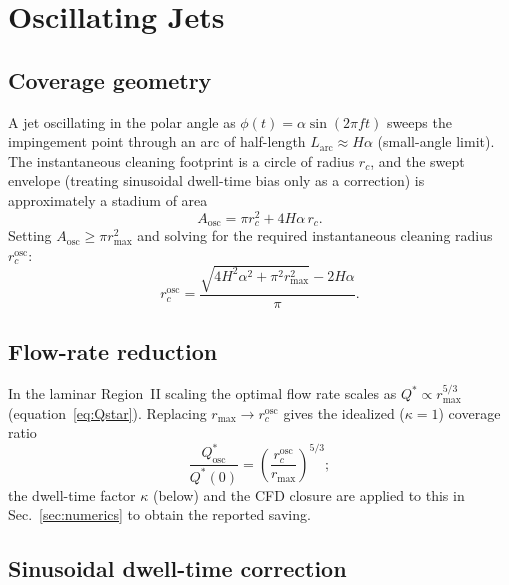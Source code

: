 \documentclass[aps,prfluids,reprint,amsmath,amssymb,floatfix]{revtex4-2}
\begin{document}
\section{Oscillating Jets}
\label{sec:oscillating}

\subsection{Coverage geometry}

A jet oscillating in the polar angle as $\phi(t) = \alpha\sin(2\pi f t)$
sweeps the impingement point through an arc of half-length $L_\mathrm{arc}
\approx H\alpha$ (small-angle limit). The instantaneous cleaning footprint
is a circle of radius $r_c$, and the swept envelope (treating sinusoidal
dwell-time bias only as a correction) is approximately a stadium of area
\begin{equation}
  A_\mathrm{osc} = \pi r_c^2 + 4 H \alpha\,r_c.
  \label{eq:Aosc}
\end{equation}
Setting $A_\mathrm{osc} \geq \pi r_\mathrm{max}^2$ and solving for the
required instantaneous cleaning radius $r_c^\mathrm{osc}$:
\begin{equation}
  r_c^\mathrm{osc} =
  \frac{\sqrt{4 H^2 \alpha^2 + \pi^2 r_\mathrm{max}^2} - 2 H\alpha}{\pi}.
  \label{eq:rcosc}
\end{equation}

\subsection{Flow-rate reduction}

In the laminar Region~II scaling the optimal flow rate scales as
$Q^* \propto r_\mathrm{max}^{5/3}$ (equation~\eqref{eq:Qstar}). Replacing
$r_\mathrm{max} \to r_c^\mathrm{osc}$ gives the idealized ($\kappa = 1$)
coverage ratio
\begin{equation}
  \frac{Q^*_\mathrm{osc}}{Q^*(0)} = \left(\frac{r_c^\mathrm{osc}}{r_\mathrm{max}}\right)^{5/3};
  \label{eq:Qosc}
\end{equation}
the dwell-time factor $\kappa$ (below) and the CFD closure are applied to this
in Sec.~\ref{sec:numerics} to obtain the reported saving.

\subsection{Sinusoidal dwell-time correction}
\end{document}
